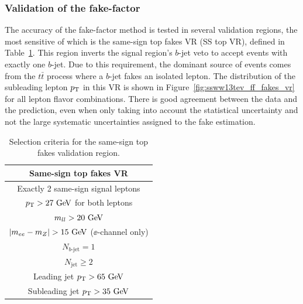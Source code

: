 \subsubsection{Validation of the fake-factor}\label{ssww13tev:ff_vr}
The accuracy of the fake-factor method is tested in several validation regions, the most sensitive of which is the same-sign top fakes VR (SS top VR), defined in Table~\ref{tab:ssww13tev_topfakes_vr_def}.
This region inverts the signal region's $b$-jet veto to accept events with exactly one $b$-jet.
Due to this requirement, the dominant source of events comes from the $t\bar{t}$ process where a $b$-jet fakes an isolated lepton.
The distribution of the subleading lepton $p_{\mathrm{T}}$ in this VR is shown in Figure~\ref{fig:ssww13tev_ff_fakes_vr} for all lepton flavor combinations.
There is good agreement between the data and the prediction, even when only taking into account the statistical uncertainty and not the large systematic uncertainties assigned to the fake estimation.

\begin{table}[htbp]
  \centering
  \begin{tabular}{c}
    Same-sign top fakes VR \\
    \hline\hline
    Exactly 2 same-sign signal leptons\\
    $\pt > 27\gev$ for both leptons \\
    $m_{ll} > 20\gev$\\
    $|m_{ee} - m_Z| > 15\gev$ ($\ee$-channel only) \\
    $N_{b\textrm{-jet}} = 1$\\
    $N_{\textrm{jet}} \ge 2$ \\
    Leading jet $\pt > 65\gev$ \\
    Subleading jet $\pt > 35\gev$ \\
    \hline
  \end{tabular}
  \caption{Selection criteria for the same-sign top fakes validation region.}
  \label{tab:ssww13tev_topfakes_vr_def}
\end{table}


